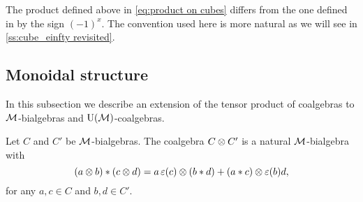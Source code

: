 \begin{remark*}
	The product defined above in \cref{eq:product on cubes} differs from the one defined in \cite{medina2022cube_einfty} by the sign $(-1)^x$.
	The convention used here is more natural as we will see in \cref{ss:cube_einfty revisited}.
\end{remark*}

\subsection{Monoidal structure}\label{ss:monoidal structures}

In this subsection we describe an extension of the tensor product of coalgebras to $\mathcal{M}$-bialgebras and ${\operatorname{U}(\mathcal{M})}$-coalgebras.

\begin{lemma}\label{l:monoidal M-bialg}
	Let $C$ and $C'$ be $\mathcal{M}$-bialgebras.
	The coalgebra $C \otimes C'$ is a natural $\mathcal{M}$-bialgebra with
	\begin{equation}\label{eq:monoidal_product}
		(a \otimes b) \ast (c \otimes d) =
		a \operatorname{\varepsilon}(c) \otimes (b \ast d) + (a \ast c) \otimes \operatorname{\varepsilon}(b) d,
	\end{equation}
	for any $a,c \in C$ and $b,d \in C'$.
\end{lemma}

